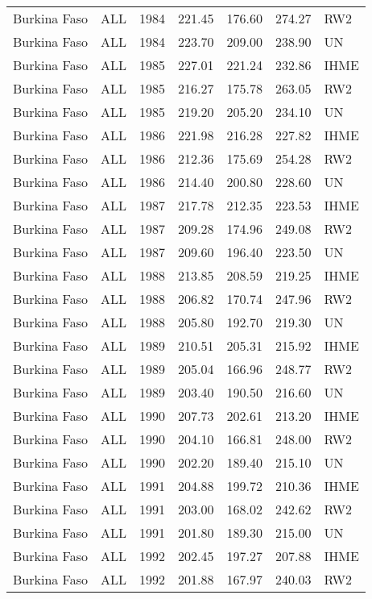 \begin{longtable}{lllrrrl}
  Burkina Faso & ALL & 1984 & 221.45 & 176.60 & 274.27 & RW2 \\ 
  Burkina Faso & ALL & 1984 & 223.70 & 209.00 & 238.90 & UN \\ 
  Burkina Faso & ALL & 1985 & 227.01 & 221.24 & 232.86 & IHME \\ 
  Burkina Faso & ALL & 1985 & 216.27 & 175.78 & 263.05 & RW2 \\ 
  Burkina Faso & ALL & 1985 & 219.20 & 205.20 & 234.10 & UN \\ 
  Burkina Faso & ALL & 1986 & 221.98 & 216.28 & 227.82 & IHME \\ 
  Burkina Faso & ALL & 1986 & 212.36 & 175.69 & 254.28 & RW2 \\ 
  Burkina Faso & ALL & 1986 & 214.40 & 200.80 & 228.60 & UN \\ 
  Burkina Faso & ALL & 1987 & 217.78 & 212.35 & 223.53 & IHME \\ 
  Burkina Faso & ALL & 1987 & 209.28 & 174.96 & 249.08 & RW2 \\ 
  Burkina Faso & ALL & 1987 & 209.60 & 196.40 & 223.50 & UN \\ 
  Burkina Faso & ALL & 1988 & 213.85 & 208.59 & 219.25 & IHME \\ 
  Burkina Faso & ALL & 1988 & 206.82 & 170.74 & 247.96 & RW2 \\ 
  Burkina Faso & ALL & 1988 & 205.80 & 192.70 & 219.30 & UN \\ 
  Burkina Faso & ALL & 1989 & 210.51 & 205.31 & 215.92 & IHME \\ 
  Burkina Faso & ALL & 1989 & 205.04 & 166.96 & 248.77 & RW2 \\ 
  Burkina Faso & ALL & 1989 & 203.40 & 190.50 & 216.60 & UN \\ 
  Burkina Faso & ALL & 1990 & 207.73 & 202.61 & 213.20 & IHME \\ 
  Burkina Faso & ALL & 1990 & 204.10 & 166.81 & 248.00 & RW2 \\ 
  Burkina Faso & ALL & 1990 & 202.20 & 189.40 & 215.10 & UN \\ 
  Burkina Faso & ALL & 1991 & 204.88 & 199.72 & 210.36 & IHME \\ 
  Burkina Faso & ALL & 1991 & 203.00 & 168.02 & 242.62 & RW2 \\ 
  Burkina Faso & ALL & 1991 & 201.80 & 189.30 & 215.00 & UN \\ 
  Burkina Faso & ALL & 1992 & 202.45 & 197.27 & 207.88 & IHME \\ 
  Burkina Faso & ALL & 1992 & 201.88 & 167.97 & 240.03 & RW2 \\ 

\end{longtable}
